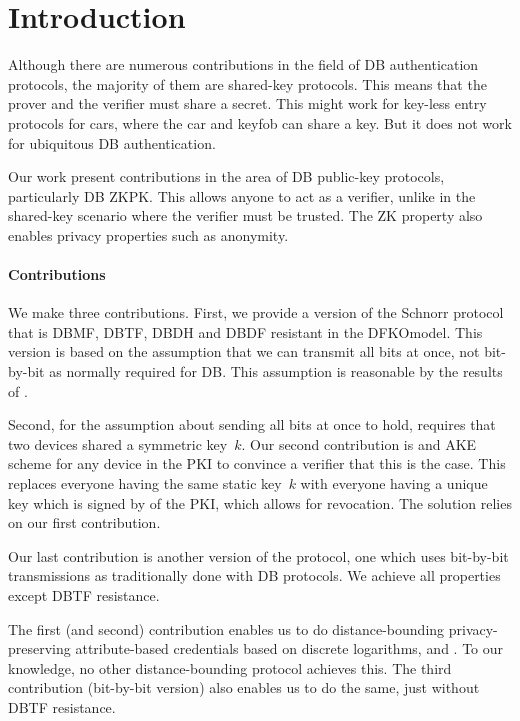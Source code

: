 \section{Introduction}%
\label{Introduction}

Although there are numerous contributions in the field of \ac{DB} 
authentication protocols, the majority of them are shared-key protocols.
This means that the prover and the verifier must share a secret.
This might work for key-less entry protocols for cars, where the car and keyfob 
can share a key.
But it does not work for ubiquitous \ac{DB} authentication.

Our work present contributions in the area of \ac{DB} public-key protocols, 
particularly \ac{DB} \ac{ZKPK}.
This allows anyone to act as a verifier, unlike in the shared-key scenario 
where the verifier must be trusted.
The \ac{ZK} property also enables privacy properties such as anonymity.

\paragraph*{Contributions}

We make three contributions.
First, we provide a version of the Schnorr protocol that is \ac{DBMF}, 
\ac{DBTF}, \ac{DBDH} and \ac{DBDF} resistant in the \ac{DFKOmodel}.
This version is based on the assumption that we can transmit all bits at once, 
not bit-by-bit as normally required for \ac{DB}.
This assumption is reasonable by the results of \textcite{UWBPR}.

Second, for the assumption about sending all bits at once to hold, 
\textcite{UWBPR} requires that two devices shared a symmetric key~\(k\).
Our second contribution is  and \ac{AKE} scheme for any device in 
the \ac{PKI} to convince a verifier that this is the case.
This replaces everyone having the same static key~\(k\) with everyone having a 
unique key which is signed by  of the \ac{PKI}, which allows for 
revocation.
The solution relies on our first contribution.

Our last contribution is another version of the protocol, one which uses 
bit-by-bit transmissions as traditionally done with \ac{DB} protocols.
We achieve all properties except \ac{DBTF} resistance.

The first (and second) contribution enables us to do distance-bounding 
privacy-preserving attribute-based credentials based on discrete logarithms, 
\eg \cite{Camenisch-phdthesis} and \cite{CLsignatures}.
To our knowledge, no other distance-bounding protocol achieves this.
The third contribution (bit-by-bit version) also enables us to do the same, 
just without \ac{DBTF} resistance.

